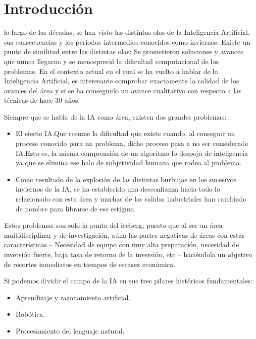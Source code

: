 \chapter{Introducción}
\label{chap:introduccion}

 lo largo de las décadas, se han visto las distintas olas de la
Inteligencia Artificial, sus consecuencias y los periodos intermedios conocidos
como inviernos. Existe un punto de similitud entre las distintas olas: Se
prometieron soluciones y avances que nunca llegaron y se menospreció la
dificultad computacional de los problemas. En el contexto actual en el cual se
ha vuelto a hablar de la Inteligencia Artificial, es interesante comprobar
exactamente la calidad de los avances del área y si se ha conseguido un avance
cualitativo con respecto a las técnicas de hace 30 años.

Siempre que se habla de la IA como área, existen dos grandes problemas:
\begin{itemize}
\item El efecto IA.Que resume la dificultad que existe cuando, al conseguir un
  proceso conocido para un problema, dicho proceso pasa a no ser considerado
  IA.Esto es, la misma comprensión de un algoritmo lo despoja de inteligencia
  ya que se elimina ese halo de subjetividad humana que rodea al problema.
\item Como resultado de la explosión de las distintas burbujas en los
  sucesivos inviernos de la IA, se ha establecido una desconfianza hacia todo
  lo relacionado con esta área y muchas de las salidas industriales han
  cambiado de nombre para librarse de ese estigma.
\end{itemize}
  
Estos problemas son solo la punta del iceberg, puesto que al ser un área
multidisciplinar y de investigación, aúna las partes negativas de áreas con
estas características – Necesidad de equipo con muy alta preparación, necesidad
de inversión fuerte, baja tasa de retorno de la inversión, etc – haciéndola un
objetivo de recortes inmediatos en tiempos de escasez económica.

Si podemos dividir el campo de la IA en sus tres pilares históricos fundamentales:
\begin{itemize}
\item Aprendizaje y razonamiento artificial.
\item Robótica.
\item Procesamiento del lenguaje natural.
\end{itemize}

